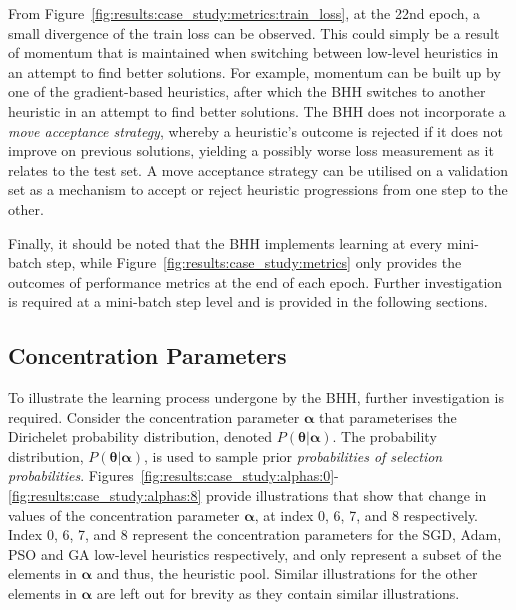 From Figure~\ref{fig:results:case_study:metrics:train_loss}, at the 22nd epoch, a small divergence of the train loss can be observed. This could simply be a result of momentum that is maintained when switching between low-level heuristics in an attempt to find better solutions. For example, momentum can be built up by one of the gradient-based heuristics, after which the \acs{BHH} switches to another heuristic in an attempt to find better solutions. The \acs{BHH} does not incorporate a \textit{move acceptance strategy}, whereby a heuristic's outcome is rejected if it does not improve on previous solutions, yielding a possibly worse loss measurement as it relates to the test set. A move acceptance strategy can be utilised on a validation set as a mechanism to accept or reject heuristic progressions from one step to the other.

Finally, it should be noted that the \acs{BHH} implements learning at every mini-batch step, while Figure~\ref{fig:results:case_study:metrics} only provides the outcomes of performance metrics at the end of each epoch. Further investigation is required at a mini-batch step level and is provided in the following sections.



\subsection{Concentration Parameters}\label{sec:results:case_study:concentration_parameters}

To illustrate the learning process undergone by the \acs{BHH}, further investigation is required. Consider the concentration parameter $\boldsymbol{\alpha}$ that parameterises the Dirichelet probability distribution, denoted $P(\boldsymbol{\theta} \vert \boldsymbol{\alpha})$. The probability distribution, $P(\boldsymbol{\theta} \vert \boldsymbol{\alpha})$, is used to sample prior \textit{probabilities of selection probabilities}. Figures~\ref{fig:results:case_study:alphas:0}-\ref{fig:results:case_study:alphas:8} provide illustrations that show that change in values of the concentration parameter $\boldsymbol{\alpha}$, at index 0, 6, 7, and 8 respectively. Index 0, 6, 7, and 8 represent the concentration parameters for the \acs{SGD}, \acs{Adam}, \acs{PSO} and \acs{GA} low-level heuristics respectively, and only represent a subset of the elements in $\boldsymbol{\alpha}$ and thus, the heuristic pool. Similar illustrations for the other elements in $\boldsymbol{\alpha}$ are left out for brevity as they contain similar illustrations.

